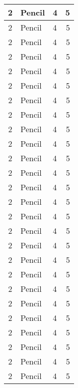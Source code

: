 \documentclass{article}
\begin{document}
\begin{tabular}{|c|l|l|r|}
        \hline
        2 & Pencil & 4 & 5\\
        \hline
        2 & Pencil & 4 & 5\\
        \hline
        2 & Pencil & 4 & 5\\
        \hline
        2 & Pencil & 4 & 5\\
        \hline
        2 & Pencil & 4 & 5\\
        \hline
        2 & Pencil & 4 & 5\\
        \hline
        2 & Pencil & 4 & 5\\
        \hline
        2 & Pencil & 4 & 5\\
        \hline
        2 & Pencil & 4 & 5\\
        \hline
        2 & Pencil & 4 & 5\\
        \hline
        2 & Pencil & 4 & 5\\
        \hline
        2 & Pencil & 4 & 5\\
        \hline
        2 & Pencil & 4 & 5\\
        \hline
        2 & Pencil & 4 & 5\\
        \hline
        2 & Pencil & 4 & 5\\
        \hline
        2 & Pencil & 4 & 5\\
        \hline
        2 & Pencil & 4 & 5\\
        \hline
        2 & Pencil & 4 & 5\\
        \hline
        2 & Pencil & 4 & 5\\
        \hline
        2 & Pencil & 4 & 5\\
        \hline
        2 & Pencil & 4 & 5\\
        \hline
        2 & Pencil & 4 & 5\\
        \hline
        2 & Pencil & 4 & 5\\
        \hline
        2 & Pencil & 4 & 5\\
        \hline
        2 & Pencil & 4 & 5\\
        \hline
        2 & Pencil & 4 & 5\\
        \hline
    \end{tabular}
\end{document}
